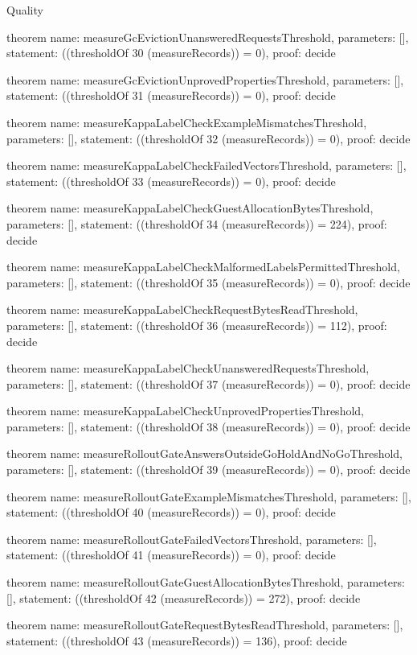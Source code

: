 \begin{lexlean}{Quality}
\begin{semanticmodule}
theorem{
  name: measureGcEvictionUnansweredRequestsThreshold,
  parameters: [],
  statement: ((thresholdOf 30 (measureRecords)) = 0),
  proof: decide{}
}

theorem{
  name: measureGcEvictionUnprovedPropertiesThreshold,
  parameters: [],
  statement: ((thresholdOf 31 (measureRecords)) = 0),
  proof: decide{}
}

theorem{
  name: measureKappaLabelCheckExampleMismatchesThreshold,
  parameters: [],
  statement: ((thresholdOf 32 (measureRecords)) = 0),
  proof: decide{}
}

theorem{
  name: measureKappaLabelCheckFailedVectorsThreshold,
  parameters: [],
  statement: ((thresholdOf 33 (measureRecords)) = 0),
  proof: decide{}
}

theorem{
  name: measureKappaLabelCheckGuestAllocationBytesThreshold,
  parameters: [],
  statement: ((thresholdOf 34 (measureRecords)) = 224),
  proof: decide{}
}

theorem{
  name: measureKappaLabelCheckMalformedLabelsPermittedThreshold,
  parameters: [],
  statement: ((thresholdOf 35 (measureRecords)) = 0),
  proof: decide{}
}

theorem{
  name: measureKappaLabelCheckRequestBytesReadThreshold,
  parameters: [],
  statement: ((thresholdOf 36 (measureRecords)) = 112),
  proof: decide{}
}

theorem{
  name: measureKappaLabelCheckUnansweredRequestsThreshold,
  parameters: [],
  statement: ((thresholdOf 37 (measureRecords)) = 0),
  proof: decide{}
}

theorem{
  name: measureKappaLabelCheckUnprovedPropertiesThreshold,
  parameters: [],
  statement: ((thresholdOf 38 (measureRecords)) = 0),
  proof: decide{}
}

theorem{
  name: measureRolloutGateAnswersOutsideGoHoldAndNoGoThreshold,
  parameters: [],
  statement: ((thresholdOf 39 (measureRecords)) = 0),
  proof: decide{}
}

theorem{
  name: measureRolloutGateExampleMismatchesThreshold,
  parameters: [],
  statement: ((thresholdOf 40 (measureRecords)) = 0),
  proof: decide{}
}

theorem{
  name: measureRolloutGateFailedVectorsThreshold,
  parameters: [],
  statement: ((thresholdOf 41 (measureRecords)) = 0),
  proof: decide{}
}

theorem{
  name: measureRolloutGateGuestAllocationBytesThreshold,
  parameters: [],
  statement: ((thresholdOf 42 (measureRecords)) = 272),
  proof: decide{}
}

theorem{
  name: measureRolloutGateRequestBytesReadThreshold,
  parameters: [],
  statement: ((thresholdOf 43 (measureRecords)) = 136),
  proof: decide{}
}


\end{semanticmodule}
\end{lexlean}
